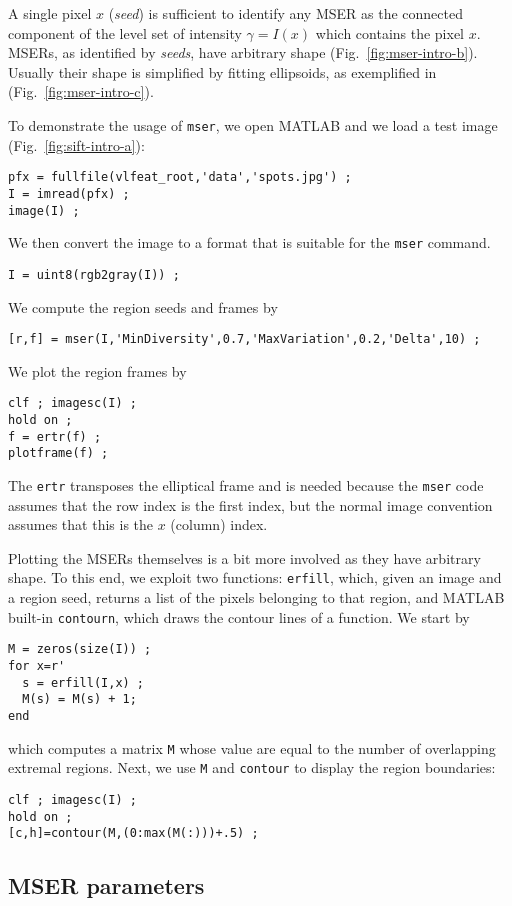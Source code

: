 \documentclass[9.5pt]{article}
\newcommand{\cmd}  [1]{{\color{red}\tt   #1}}
\begin{document}
A single pixel $x$ ({\em seed}) is sufficient to identify any MSER as
the connected component of the level set of intensity $\gamma=I(x)$ which contains the
pixel $x$. MSERs, as identified by {\em seeds}, have arbitrary shape (Fig.~\ref{fig:mser-intro-b}). Usually their shape is simplified by fitting ellipsoids, as exemplified in (Fig.~\ref{fig:mser-intro-c}).

To demonstrate the usage of \cmd{mser}, we open MATLAB and we load a
test image (Fig.~\ref{fig:sift-intro-a}):
\begin{verbatim}
pfx = fullfile(vlfeat_root,'data','spots.jpg') ;
I = imread(pfx) ;
image(I) ; 
\end{verbatim}
We then convert the image to a format that is suitable for the \cmd{mser} command.
\begin{verbatim}
I = uint8(rgb2gray(I)) ;
\end{verbatim}
We compute the region seeds and frames by
\begin{verbatim}
[r,f] = mser(I,'MinDiversity',0.7,'MaxVariation',0.2,'Delta',10) ;
\end{verbatim}
We plot the region frames by
\begin{verbatim}
clf ; imagesc(I) ; 
hold on ;
f = ertr(f) ;
plotframe(f) ;
\end{verbatim}
The \cmd{ertr} transposes the elliptical frame and is needed because the \cmd{mser} code assumes that the row index is the first index, but the normal image convention assumes that this is the $x$ (column) index.

Plotting the MSERs themselves is a bit more involved as they have arbitrary shape.
To this end, we exploit two functions: \cmd{erfill}, which, given an image and a region seed,  returns a list of the pixels belonging to that region, and MATLAB built-in \cmd{contourn}, which draws the contour lines of a function. We start by
\begin{verbatim}
M = zeros(size(I)) ;
for x=r'
  s = erfill(I,x) ;
  M(s) = M(s) + 1;
end
\end{verbatim}
which computes a matrix \verb$M$ whose value are equal to the number of overlapping extremal
regions. Next, we use \verb$M$ and \cmd{contour} to display the region boundaries:
\begin{verbatim}
clf ; imagesc(I) ;
hold on ;
[c,h]=contour(M,(0:max(M(:)))+.5) ;
\end{verbatim}


\subsection{MSER parameters}\label{mser.parameters}
\end{document}
